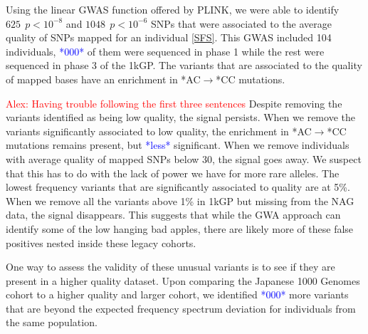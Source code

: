 \documentclass[9pt,lineno]{elife}
\newcommand{\todo}[1]{\textcolor{blue}{*#1*}}
\newcommand{\alex}[1]{\textcolor{red}{Alex: #1}}
\begin{document}
Using the linear GWAS function offered by PLINK, we were able to identify $625\ \  p < 10^{-8}$ and $1048\ \ p < 10^{-6}$ SNPs that were associated to the average quality of SNPs mapped for an individual \ref{SFS}.  This GWAS included 104 individuals, \todo{000} of them were sequenced in phase 1 while the rest were sequenced in phase 3 of the 1kGP.
The variants that are associated to the quality of mapped bases have an enrichment in *AC${\rightarrow}$*CC mutations. 

\alex{Having trouble following the first three sentences}
Despite removing the variants identified as being low quality, the signal persists. 
When we remove the variants significantly associated to low quality, the enrichment in *AC${\rightarrow}$*CC mutations remains present, but \todo{less} significant. 
When we remove individuals with average quality of mapped SNPs below 30, the signal goes away. 
We suspect that this has to do with the lack of power we have for more rare alleles. 
The lowest frequency variants that are significantly associated to quality are at 5\%. 
When we remove all the variants above 1\% in 1kGP but missing from the NAG data, the signal disappears.
This suggests that while the GWA approach can identify some of the low hanging bad apples, there are likely more of these false positives nested inside these legacy cohorts. 

One way to assess the validity of these unusual variants is to see if they are present in a higher quality dataset. Upon comparing the Japanese 1000 Genomes cohort to a higher quality and larger cohort, we identified \todo{000} more variants that are beyond the expected frequency spectrum deviation for individuals from the same population. 
\end{document}
